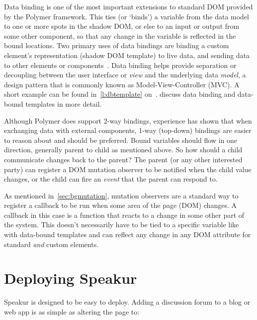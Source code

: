 Data binding is one of the most important extensions to standard DOM provided by the Polymer framework. 
This ties (or `binds') a variable from the data model to one or more spots in the shadow DOM, or else to an input or output from some other component, 
so that any change in the variable is reflected in the bound locations.
Two primary uses of data bindings are
binding a custom element's representation (shadow DOM template) to live data, 
and sending data to other elements or components~\cite{polymercontributors2015-b}. 
Data binding helps provide separation or decoupling between the user interface or \textit{view} and the underlying data \textit{model}, 
a design pattern that is commonly known as 
Model-View-Controller (MVC).
A short example can be found in~\cref{l:dbtemplate} on~.
 discuss data binding and data-bound templates in more detail.

Although Polymer does support 2-way bindings, 
experience has shown that when exchanging data with external components, 1-way (top-down) bindings are easier to reason about and should be preferred.
Bound variables should flow in one direction, generally parent to child as mentioned above.
So how should a child communicate changes back to the parent? 
The parent (or any other interested party) can register a DOM mutation observer to be notified when the child value changes, or the child can fire an \textit{event} that the parent can respond to.

As mentioned in~\cref{sec:bgmutation}, 
mutation observers are a standard way to register a callback to be run when some area of the page (DOM) changes. 
A callback in this case is a function that reacts to a change in some other part of the system.
This doesn't necessarily have to be tied to a specific variable like with data-bound templates and can reflect any change in any DOM attribute for standard \textit{and} custom elements. 

\section{Deploying Speakur}
Speakur is designed to be easy to deploy.
Adding a discussion forum to a blog or web app is as simple as altering the page to:

